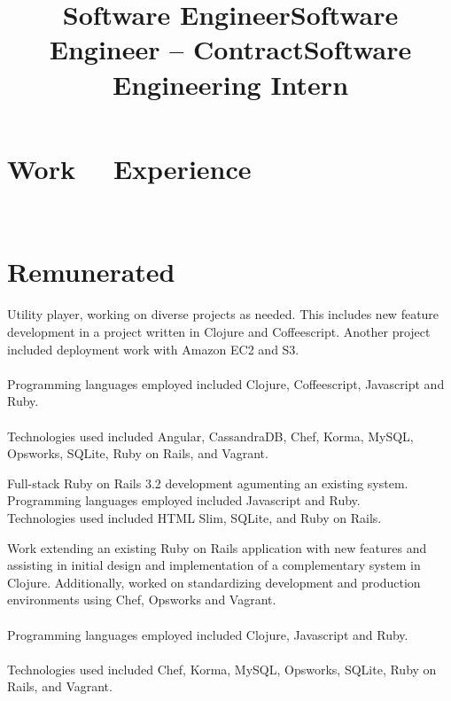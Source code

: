 \documentclass[margintitle,line]{res}
\renewcommand{\subsection}[1]{\section{\normalfont #1}}
\begin{document}
\begin{resume}


\section{Work \ \ Experience}
\ \\
\subsection{Remunerated}

\title{Software Engineer}
\begin{position}
 Utility player, working on diverse projects as needed. This includes new feature development in a project written in Clojure and Coffeescript. Another project included deployment work with Amazon EC2 and S3. \\ \ \\
 Programming languages employed included Clojure, Coffeescript, Javascript and Ruby. \\ \ \\
 Technologies used included Angular, CassandraDB, Chef, Korma, MySQL, Opsworks, SQLite, Ruby on Rails, and Vagrant.
\end{position}

\title{Software Engineer -- Contract}
\begin{position}
 Full-stack Ruby on Rails 3.2 development agumenting an existing system.
 Programming languages employed included Javascript and Ruby. \\
 Technologies used included HTML Slim, SQLite, and Ruby on Rails.
\end{position}

\title{Software Engineering Intern}
\begin{position}
 Work extending an existing Ruby on Rails application with new features and assisting in initial design and implementation of a complementary system in  Clojure. Additionally, worked on standardizing development and production environments using Chef, Opsworks and Vagrant. \\ \ \\
 Programming languages employed included Clojure, Javascript and Ruby. \\ \ \\
 Technologies used included Chef, Korma, MySQL, Opsworks, SQLite, Ruby on Rails, and Vagrant.
\end{position}


\end{resume}
\end{document}

